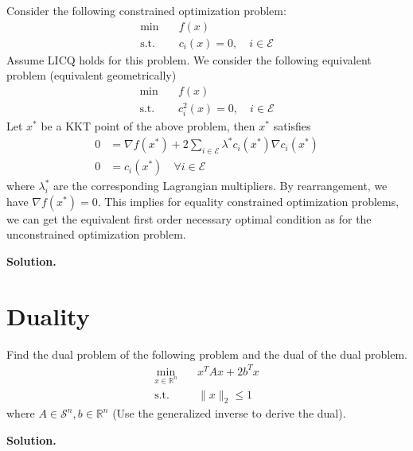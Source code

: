 \documentclass{article}
\begin{document}
\bigskip
Consider the following constrained optimization problem:
\begin{align*}
    \min \quad &f(x) \\
    \text{s.t.} \quad &c_i(x) = 0, \quad i \in \mathcal E 
\end{align*}
Assume LICQ holds for this problem. We consider the following equivalent problem (equivalent geometrically)
\begin{align*}
    \min \quad &f(x) \\
    \text{s.t.} \quad &c_i^2(x) = 0, \quad i \in \mathcal E
\end{align*}
Let $x^*$ be a KKT point of the above problem, then $x^*$ satisfies 
\begin{align*}
    0 &= \nabla f(x^*) + 2 \sum_{i \in \mathcal E} \lambda^* c_i(x^*) \nabla c_i(x^*) \\
    0 &= c_i(x^*) \quad \forall i \in \mathcal E
\end{align*}
where $\lambda_i^*$ are the corresponding Lagrangian multipliers. By rearrangement, we have $\nabla f(x^*) = 0$. This implies for equality constrained optimization problems, we can get the equivalent first order necessary optimal condition as for the unconstrained optimization problem.

\textbf{Solution.}

\section{Duality}
Find the dual problem of the following problem and the dual of the dual problem.
\begin{align*}
    \min_{x \in \mathbb R^n} \quad & x^TAx + 2b^T x \\
    \text{s.t.} \quad & \|x\|_2 \leq 1
\end{align*}
where $A \in \mathcal S^n, b \in \mathbb R^n$ (Use the generalized inverse to derive the dual).

\textbf{Solution.}
\end{document}
